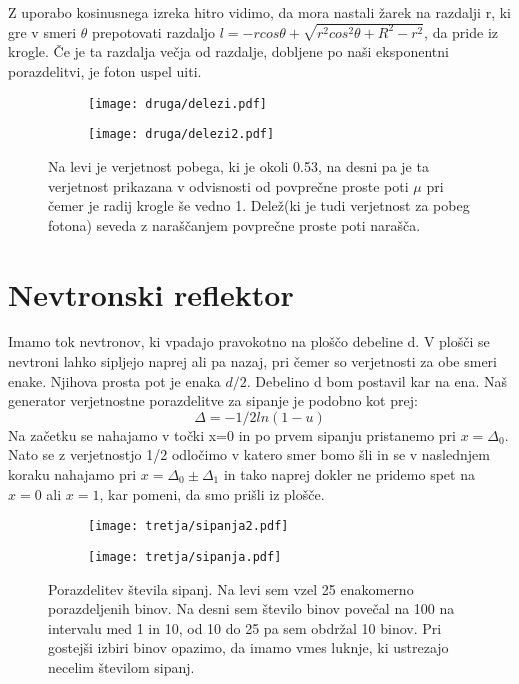 \documentclass{article}
\begin{document}
Z uporabo kosinusnega izreka hitro vidimo, da mora nastali žarek na razdalji r, ki gre v smeri $\theta$ prepotovati razdaljo $l = -r cos\theta + \sqrt{r^2 cos^2\theta + R^2-r^2}
$, da pride iz krogle. Če je ta razdalja večja od razdalje, dobljene po naši eksponentni porazdelitvi, je foton uspel uiti.

\begin{figure}[H]
\centering
\begin{subfigure}{.49\textwidth}
\texttt{[image: druga/delezi.pdf]}
\end{subfigure}
\begin{subfigure}{.49\textwidth}
\texttt{[image: druga/delezi2.pdf]}
\end{subfigure}
\caption*{Na levi je verjetnost pobega, ki je okoli 0.53, na desni pa je ta verjetnost prikazana v odvisnosti od povprečne proste poti $\mu$ pri čemer je radij krogle še vedno 1. Delež(ki je tudi verjetnost za pobeg fotona) seveda z naraščanjem povprečne proste poti narašča.}
\end{figure}

\section{Nevtronski reflektor}

Imamo tok nevtronov, ki vpadajo pravokotno na ploščo debeline d. V plošči se nevtroni lahko sipljejo naprej ali pa nazaj, pri čemer so verjetnosti
za obe smeri enake. Njihova prosta pot je enaka $d/2$. Debelino d bom postavil kar na ena.
Naš generator verjetnostne porazdelitve za sipanje je podobno kot prej:
\begin{equation*}
\Delta = -1/2 ln(1-u)
\end{equation*}
Na začetku se nahajamo v točki x=0 in po prvem sipanju pristanemo pri $x=\Delta_0$.  Nato se z verjetnostjo 1/2 odločimo v katero smer bomo šli in se v naslednjem koraku nahajamo pri $x=\Delta_0 \pm \Delta_1$ in tako naprej dokler ne pridemo spet na $x=0$ ali $x=1$, kar pomeni, da smo prišli iz plošče.

\begin{figure}[H]
\centering
\begin{subfigure}{.49\textwidth}
\texttt{[image: tretja/sipanja2.pdf]}
\end{subfigure}
\begin{subfigure}{.49\textwidth}
\texttt{[image: tretja/sipanja.pdf]}
\end{subfigure}
\caption*{Porazdelitev števila sipanj. Na levi sem vzel 25 enakomerno porazdeljenih binov. Na desni sem število binov povečal na 100 na intervalu med 1 in 10, od 10 do 25 pa sem obdržal 10 binov. Pri gostejši izbiri binov opazimo, da imamo vmes luknje, ki ustrezajo necelim številom sipanj. }
\end{figure}
\end{document}
